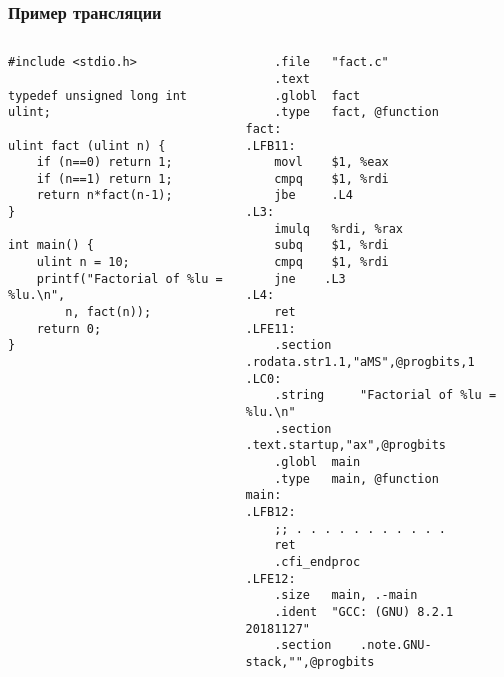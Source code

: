 \documentclass[10pt]{beamer}
\begin{document}
\begin{frame}[fragile]
  \frametitle{Пример трансляции}
   \begin{columns}
     \begin{column}{0.5\textwidth}
 \begin{verbatim}
#include <stdio.h>

typedef unsigned long int ulint;

ulint fact (ulint n) {
    if (n==0) return 1;
    if (n==1) return 1;
    return n*fact(n-1);
}

int main() {
    ulint n = 10;
    printf("Factorial of %lu = %lu.\n",
        n, fact(n));
    return 0;
}
 \end{verbatim}
     \end{column}
      \begin{column}{0.5\textwidth}
\begin{verbatim}
	.file   "fact.c"
	.text
	.globl  fact
	.type   fact, @function
fact:
.LFB11:
	movl    $1, %eax
	cmpq    $1, %rdi
	jbe     .L4
.L3:
	imulq   %rdi, %rax
	subq    $1, %rdi
	cmpq    $1, %rdi
	jne    .L3
.L4:
	ret
.LFE11:
	.section    .rodata.str1.1,"aMS",@progbits,1
.LC0:
	.string     "Factorial of %lu = %lu.\n"
	.section    .text.startup,"ax",@progbits
	.globl  main
	.type   main, @function
main:
.LFB12:
	;; . . . . . . . . . . .
	ret
	.cfi_endproc
.LFE12:
	.size   main, .-main
	.ident  "GCC: (GNU) 8.2.1 20181127"
	.section    .note.GNU-stack,"",@progbits
\end{verbatim}
      \end{column}
    \end{columns}
 \end{frame}
\end{document}
